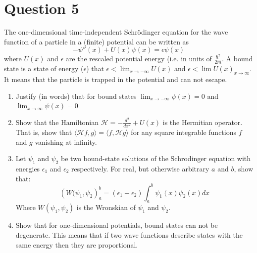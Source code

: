 \documentclass[12pt]{article}
\begin{document}
\section*{Question 5}
    The one-dimensional time-independent Schrödinger equation for the wave function of a particle in a (finite) potential can be written as 
    \[
        -\psi''(x) + U(x) \psi(x) = \epsilon\psi(x)
    \]
    where $U(x)$ and $\epsilon$ are the rescaled potential energy (i.e. in units of $\frac{\hbar^2}{2m}$. A bound state is a state of energy ($\epsilon$) that $\epsilon < \lim_{x \rightarrow -\infty} U(x)$ and $\epsilon < \lim U(x)_{x \rightarrow \infty}$. It means that the particle is trapped in the potential and can not escape.
    \begin{enumerate}
        \item [a)] Justify (in words) that for bound states $\lim_{x \rightarrow -\infty} \psi(x) = 0$ and $\lim_{x \rightarrow \infty} \psi(x) = 0$
        \item [b)] Show that the Hamiltonian $\mathcal{H} = - \frac{d^2}{dx^2} + U(x)$ is the Hermitian operator. That is, show that $\langle\mathcal{H}f, g \rangle = \langle f,\mathcal{H}g \rangle$ for any square integrable functions $f$ and $g$ vanishing at infinity. 
        \item [c)] Let $\psi_1$ and $\psi_2$ be two bound-state solutions of the Schrodinger equation with energies $\epsilon_1$ and $\epsilon_2$ respectively. For real, but otherwise arbitrary $a$ and $b$, show that:
        \[
            \left(W(\psi_1,\psi_2 \right)_a^b = (\epsilon_1 - \epsilon_2) \int_a^b \psi_1(x) \psi_2(x) dx
        \]
        Where $W(\psi_1,\psi_2)$ is the Wronskian of $\psi_1$ and $\psi_2$.
        \item [d)] Show that for one-dimensional potentials, bound states can not be degenerate. This means that if two wave functions describe states with the same energy then they are proportional. 
    \end{enumerate}
    
\end{document}
